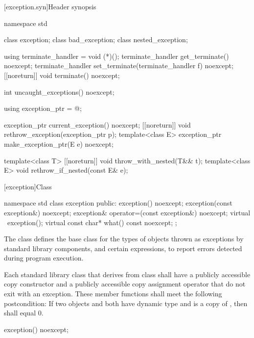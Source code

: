 [exception.syn]{Header  synopsis}
%

\begin{codeblock}
namespace std {
  class exception;
  class bad_exception;
  class nested_exception;

  using terminate_handler = void (*)();
  terminate_handler get_terminate() noexcept;
  terminate_handler set_terminate(terminate_handler f) noexcept;
  [[noreturn]] void terminate() noexcept;

  int uncaught_exceptions() noexcept;

  using exception_ptr = @\unspec@;

  exception_ptr current_exception() noexcept;
  [[noreturn]] void rethrow_exception(exception_ptr p);
  template<class E> exception_ptr make_exception_ptr(E e) noexcept;

  template<class T> [[noreturn]] void throw_with_nested(T&& t);
  template<class E> void rethrow_if_nested(const E& e);
}
\end{codeblock}

[exception]{Class }

%
\begin{codeblock}
namespace std {
  class exception {
  public:
    exception() noexcept;
    exception(const exception&) noexcept;
    exception& operator=(const exception&) noexcept;
    virtual ~exception();
    virtual const char* what() const noexcept;
  };
}
\end{codeblock}

\pnum
The class
defines the base
class for the types of objects thrown as exceptions by
\Cpp{} standard library components, and certain
expressions, to report errors detected during program execution.

\pnum
Each standard library class  that derives from class  shall have a
publicly accessible copy constructor and a publicly accessible copy assignment
operator that do not exit with an exception. These member functions shall meet
the following postcondition: If two objects  and  both have
dynamic type  and  is a copy of , then
 shall equal 0.

%
\begin{itemdecl}
exception() noexcept;
\end{itemdecl}

